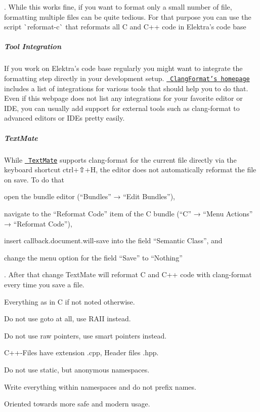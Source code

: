 . While this works fine, if you want to format only a small number of file, formatting multiple files can be quite tedious. For that purpose you can use the script \`{}reformat-\/c\`{} that reformats all C and C++ code in Elektra’s code base


\begin{DoxyCode}{0}
\end{DoxyCode}


\label{doc_CODING_md_autotoc_md986}%
%
\subparagraph*{Tool Integration}

If you work on Elektra’s code base regularly you might want to integrate the formatting step directly in your development setup. \href{https://clang.llvm.org/docs/ClangFormat.html}{\texttt{ Clang\+Format’s homepage}} includes a list of integrations for various tools that should help you to do that. Even if this webpage does not list any integrations for your favorite editor or I\+DE, you can usually add support for external tools such as {\ttfamily clang-\/format} to advanced editors or I\+D\+Es pretty easily.

\subparagraph*{Text\+Mate}

While \href{https://macromates.com}{\texttt{ Text\+Mate}} supports {\ttfamily clang-\/format} for the current file directly via the keyboard shortcut {\ttfamily ctrl}+{\ttfamily ⇧}+{\ttfamily H}, the editor does not automatically reformat the file on save. To do that


\begin{DoxyEnumerate}
\item open the bundle editor (“\+Bundles” → “\+Edit Bundles”),
\item navigate to the “\+Reformat Code” item of the C bundle (“\+C” → “\+Menu Actions” → “\+Reformat Code”),
\item insert {\ttfamily callback.\+document.\+will-\/save} into the field “\+Semantic Class”, and
\item change the menu option for the field “\+Save” to “\+Nothing”
\end{DoxyEnumerate}

. After that change Text\+Mate will reformat C and C++ code with {\ttfamily clang-\/format} every time you save a file.


\begin{DoxyItemize}
\item Everything as in C if not noted otherwise.
\item Do not use goto at all, use R\+A\+II instead.
\item Do not use raw pointers, use smart pointers instead.
\item C++-\/\+Files have extension {\ttfamily .cpp}, Header files {\ttfamily .hpp}.
\item Do not use {\ttfamily static}, but anonymous namespaces.
\item Write everything within namespaces and do not prefix names.
\item Oriented towards more safe and modern usage.
\end{DoxyItemize}

